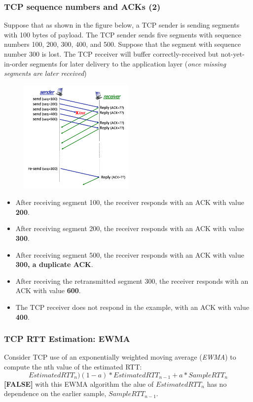     \subsubsection*{TCP sequence numbers and ACKs (2)}
    \noindent Suppose that as shown in the figure below, a TCP sender is sending segments with 100 bytes of payload. The TCP sender sends five segments with sequence
    numbers 100, 200, 300, 400, and 500. Suppose that the segment with sequence number 300 is lost. The TCP receiver will buffer correctly-received but not-yet-in-order
    segments for later delivery to the application layer (\textit{once missing segments are later received})
    \begin{figure}[H]
        \centering
        \includegraphics[width=0.5\textwidth]{img/3.5.4.jpg}
    \end{figure}
    \begin{itemize}
        \item After receiving segment 100, the receiver responds with an ACK with value \textbf{200}.
        \item After receiving segment 200, the receiver responds with an ACK with value \textbf{300}.
        \item After receiving segment 500, the receiver responds with an ACK with value \textbf{300, a duplicate ACK}.
        \item After receiving the retransmitted segment 300, the receiver responds with an ACK with value \textbf{600}.
        \item The TCP receiver does not respond in the example, with an ACK with value \textbf{400}.
    \end{itemize}

    \subsubsection*{TCP RTT Estimation: EWMA}
    \noindent Consider TCP use of an exponentially weighted moving average (\textit{EWMA}) to compute the nth value of the estimated RTT:
    $$ EstimatedRTT_n ) (1-a)*EstimatedRTT_{n-1} + a*SampleRTT_n $$
    \noindent \textbf{[FALSE]} with this EWMA algorithm the alue of \(EstimatedRTT_n\) has no dependence on the earlier sample, \( SampleRTT_{n-1}\).

